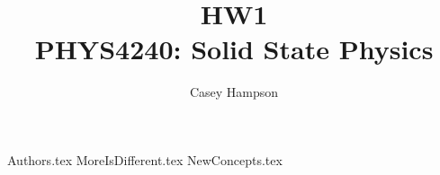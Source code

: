 \documentclass[titlepage]{article}
\title{HW1 \\[5pt] PHYS4240: Solid State Physics}
\author{Casey Hampson}
\begin{document}
    \maketitle
    \pagebreak

    {Authors.tex}
    {MoreIsDifferent.tex}
    {NewConcepts.tex}
\end{document}
